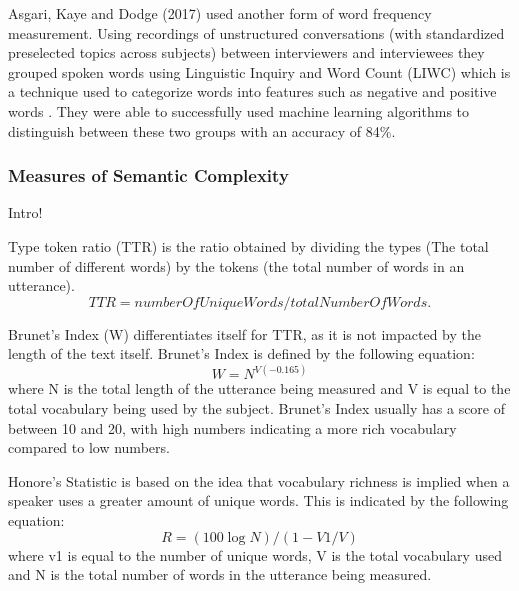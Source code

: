 \documentclass[10pt, letterpaper, twoside, openany]{thesis}
\begin{document}
\par
Asgari, Kaye and Dodge (2017) \cite{Asgari2017} used another form of word frequency measurement. Using recordings of unstructured conversations (with standardized preselected topics across subjects) between interviewers and interviewees they grouped spoken words using Linguistic Inquiry and Word Count (LIWC) which is a technique used to categorize words into features such as negative and positive words \cite{Pennebaker2015}. They were able to successfully used machine learning algorithms to distinguish between these two groups with an accuracy of 84\%.
\subsubsection{Measures of Semantic Complexity}
Intro!

Type token ratio (TTR) is the ratio obtained by dividing the types (The total number of different words) by the tokens (the total number of words in an utterance).
\begin{equation} \label{x1}
TTR = numberOfUniqueWords / totalNumberOfWords.
\end{equation}
\par 
Brunet's Index (W) differentiates itself for TTR, as it is not impacted by the length of the text itself. Brunet's Index is defined by the following equation:
\begin{equation} \label{x2}
W = N^{V(-0.165)}
\end{equation}
where N is the total length of the utterance being measured and V is equal to the total vocabulary being used by the subject. Brunet's Index usually has a score of between 10 and 20, with high numbers indicating a more rich vocabulary compared to low numbers. \newline
\par 
Honore's Statistic is based on the idea that vocabulary richness is implied when a speaker uses a greater amount of unique words. This is indicated by the following equation: 
\begin{equation} \label{x3}
R = (100 \log N) / (1 - V1/V)
\end{equation}
where v1 is equal to the number of unique words, V is the total vocabulary used and N is the total number of words in the utterance being measured.
\par 
\end{document}
